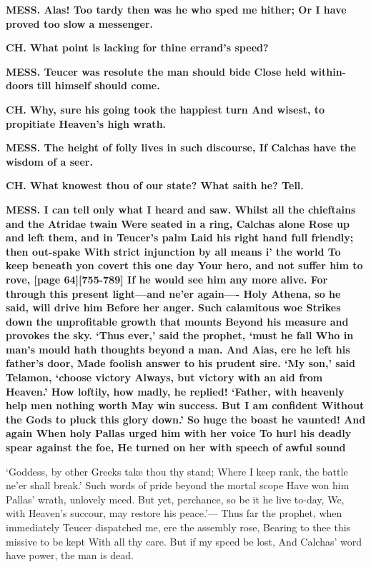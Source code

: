 \documentclass[11pt,letter]{book}
\begin{document}
\par \textbf{MESS. Alas! Too tardy then was he who sped me hither; Or I have proved too slow a messenger.}
\par 

\par \textbf{CH. What point is lacking for thine errand’s speed?}
\par 

\par \textbf{MESS. Teucer was resolute the man should bide Close held within-doors till himself should come.}
\par 

\par \textbf{CH. Why, sure his going took the happiest turn And wisest, to propitiate Heaven’s high wrath.}
\par 

\par \textbf{MESS. The height of folly lives in such discourse, If Calchas have the wisdom of a seer.}
\par 

\par \textbf{CH. What knowest thou of our state? What saith he? Tell.}
\par 

\par \textbf{MESS. I can tell only what I heard and saw. Whilst all the chieftains and the Atridae twain Were seated in a ring, Calchas alone Rose up and left them, and in Teucer’s palm Laid his right hand full friendly; then out-spake With strict injunction by all means i’ the world To keep beneath yon covert this one day Your hero, and not suffer him to rove, [page 64][755-789] If he would see him any more alive. For through this present light—and ne’er again—- Holy Athena, so he said, will drive him Before her anger. Such calamitous woe Strikes down the unprofitable growth that mounts Beyond his measure and provokes the sky. ‘Thus ever,’ said the prophet, ‘must he fall Who in man’s mould hath thoughts beyond a man. And Aias, ere he left his father’s door, Made foolish answer to his prudent sire. ‘My son,’ said Telamon, ‘choose victory Always, but victory with an aid from Heaven.’ How loftily, how madly, he replied! ‘Father, with heavenly help men nothing worth May win success. But I am confident Without the Gods to pluck this glory down.’ So huge the boast he vaunted! And again When holy Pallas urged him with her voice To hurl his deadly spear against the foe, He turned on her with speech of awful sound}
\par   ‘Goddess, by other Greeks take thou thy stand; Where I keep rank, the battle ne’er shall break.’ Such words of pride beyond the mortal scope Have won him Pallas’ wrath, unlovely meed. But yet, perchance, so be it he live to-day, We, with Heaven’s succour, may restore his peace.’— Thus far the prophet, when immediately Teucer dispatched me, ere the assembly rose, Bearing to thee this missive to be kept With all thy care. But if my speed be lost, And Calchas’ word have power, the man is dead.
\end{document}
